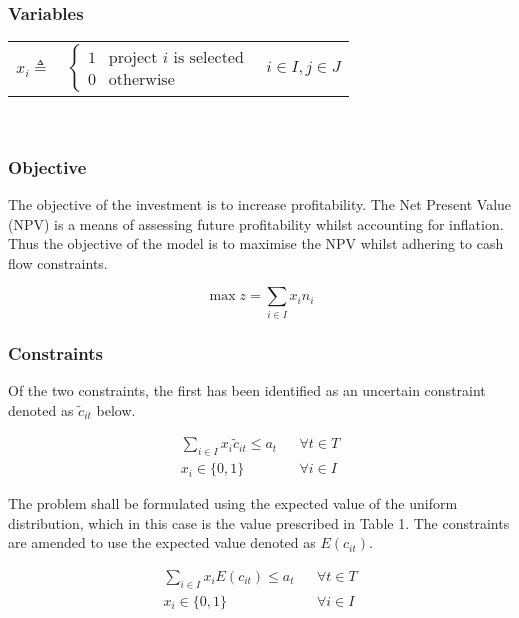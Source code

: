 \documentclass[a4paper,11pt]{article}
\begin{document}
\subsubsection{Variables}

\begin{tabular}{lll}
$x_{i} \triangleq$ & 
	$\begin{cases} 
      	1 & \text{project $i$ is selected} \\
      	0 & \text{otherwise} 
	\end{cases}$ & $i \in I, j \in J$
\end{tabular}\\

\setcounter{equation}{0}	

\subsubsection{Objective}
The objective of the investment is to increase profitability. The Net Present Value (NPV) is a means of assessing future profitability whilst accounting for inflation. Thus the objective of the model is to maximise the NPV whilst adhering to cash flow constraints.

\begin{equation}
	\max z = \sum_{i\in I} x_i n_i
\end{equation}

\subsubsection{Constraints}
Of the two constraints, the first has been identified as an uncertain constraint denoted as $\tilde{c}_{it}$ below.

\begin{align}
	\sum_{i\in I} x_i\tilde{c}_{it} \leq a_t && \forall t\in T \\
	x_i \in \{0,1\} && \forall i\in I
\end{align}

The problem shall be formulated using the expected value of the uniform distribution, which in this case is the value prescribed in Table 1. The constraints are amended to use the expected value denoted as $E({c}_{it})$.

\begin{align}
	\sum_{i\in I} x_iE({c}_{it}) \leq a_t && \forall t\in T \\
	x_i \in \{0,1\} && \forall i\in I
\end{align}
\end{document}
